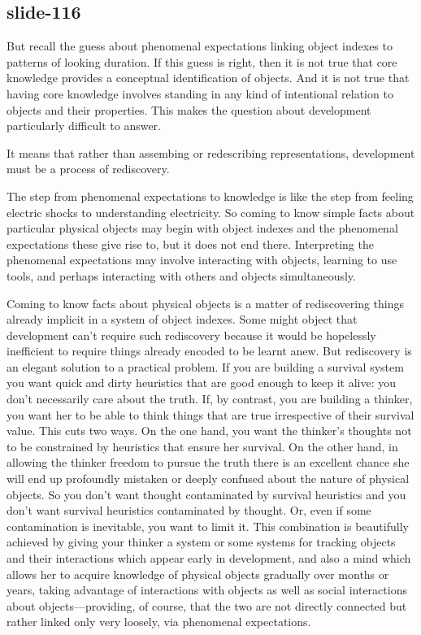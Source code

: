 \documentclass[12pt,\papersize]{extarticle}
\begin{document}
\subsection{slide-116}
But recall the guess about phenomenal expectations linking object
indexes to patterns of looking duration.
If this guess is right, then it is not true that
core knowledge provides a conceptual identification of objects.
And it is not true that having core knowledge involves standing in any
kind of intentional relation to objects and their properties.
This makes the question about development particularly
difficult to answer.

It means that rather than assembing or redescribing representations,
development must be a process of rediscovery.

The step from phenomenal expectations to knowledge is like the step
from feeling electric shocks to understanding electricity.
So coming to know simple facts about particular physical
objects may begin with object indexes and the
phenomenal expectations these give rise to, but it does not end there.
Interpreting the phenomenal expectations may involve interacting with
objects, learning to use tools, and perhaps interacting with others
and objects simultaneously.

Coming to know facts about physical objects is a matter of
rediscovering things already implicit in a system of object indexes.
Some might object that development can’t require such rediscovery
because it would be hopelessly inefficient to require things already
encoded to be learnt anew.
But rediscovery is an elegant solution to a practical problem.
If you are building a survival system you want quick and dirty
heuristics that are good enough to keep it alive: you don’t
necessarily care about the truth.
If, by contrast, you are building a thinker, you want her to be
able to think things that are true irrespective of their survival value.
This cuts two ways.
On the one hand, you want the thinker’s thoughts not to be
constrained by heuristics that ensure her survival.
On the other hand, in allowing the thinker freedom to pursue the
truth there is an excellent chance she will end up profoundly
mistaken %
or deeply confused %
about the nature of physical objects.
So you don’t want thought contaminated by survival heuristics and you
don’t want survival heuristics contaminated by thought.  Or, even if
some contamination is inevitable, you want to limit it.
This combination is beautifully achieved by giving your thinker a
system or some systems for tracking objects and their interactions
which appear early in development, and also a mind which allows her
to acquire knowledge of physical objects gradually over months or
years, taking advantage of interactions with objects as well as
social interactions about objects—providing, of course, that the
two are not directly connected but rather linked only very loosely,
via phenomenal expectations.
\end{document}
